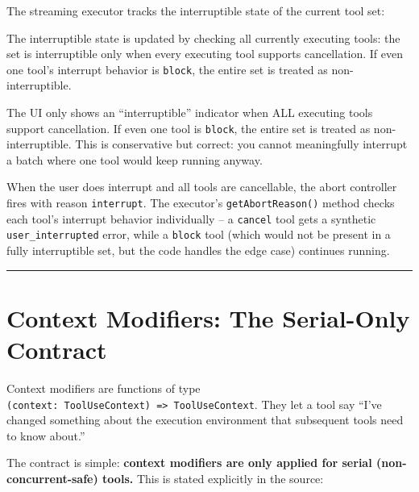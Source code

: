 \documentclass[
  english,
  11pt,
  letterpaper,
]{book}
\begin{document}
The streaming executor tracks the interruptible state of the current
tool set:

The interruptible state is updated by checking all currently executing
tools: the set is interruptible only when every executing tool supports
cancellation. If even one tool's interrupt behavior is
\texttt{\textquotesingle{}block\textquotesingle{}}, the entire set is
treated as non-interruptible.

The UI only shows an ``interruptible'' indicator when ALL executing
tools support cancellation. If even one tool is
\texttt{\textquotesingle{}block\textquotesingle{}}, the entire set is
treated as non-interruptible. This is conservative but correct: you
cannot meaningfully interrupt a batch where one tool would keep running
anyway.

When the user does interrupt and all tools are cancellable, the abort
controller fires with reason
\texttt{\textquotesingle{}interrupt\textquotesingle{}}. The executor's
\texttt{getAbortReason()} method checks each tool's interrupt behavior
individually -- a \texttt{\textquotesingle{}cancel\textquotesingle{}}
tool gets a synthetic \texttt{user\_interrupted} error, while a
\texttt{\textquotesingle{}block\textquotesingle{}} tool (which would not
be present in a fully interruptible set, but the code handles the edge
case) continues running.

\begin{center}\rule{0.5\linewidth}{0.5pt}\end{center}

\section{Context Modifiers: The Serial-Only
Contract}\label{context-modifiers-the-serial-only-contract}

Context modifiers are functions of type
\texttt{(context:\ ToolUseContext)\ =\textgreater{}\ ToolUseContext}.
They let a tool say ``I've changed something about the execution
environment that subsequent tools need to know about.''

The contract is simple: \textbf{context modifiers are only applied for
serial (non-concurrent-safe) tools.} This is stated explicitly in the
source:
\end{document}

